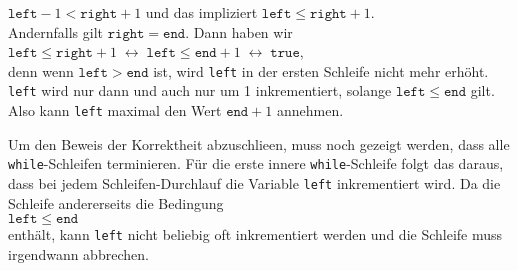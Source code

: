 \begin{enumerate}
      \hspace*{1.3cm} $\mathtt{left} - 1 < \mathtt{right} + 1$ \quad und das impliziert \quad $\mathtt{left} \leq \mathtt{right} + 1$. 
      \\[0.2cm]
      Andernfalls gilt $\texttt{right}=\mathtt{end}$.  Dann haben wir 
      \\[0.2cm]
      \hspace*{1.3cm}
      $\mathtt{left} \leq \mathtt{right} + 1 \;\leftrightarrow\;
       \mathtt{left} \leq \mathtt{end} + 1 \;\leftrightarrow\; \mathtt{true}$,
      \\[0.2cm]
      denn wenn $\texttt{left} > \mathtt{end}$ ist, wird \texttt{left} in der ersten
      Schleife nicht mehr erh\"oht.  \texttt{left} wird nur dann und auch nur um 1
      inkrementiert, solange $\texttt{left} \leq \mathtt{end}$ gilt.
      Also kann \texttt{left} maximal den Wert $\texttt{end} + 1$ annehmen.
\end{enumerate}
Um den Beweis der Korrektheit abzuschlie\3en, muss noch gezeigt werden, dass 
alle \texttt{while}-Schleifen terminieren.  F\"ur die erste innere
\texttt{while}-Schleife folgt das daraus, dass bei jedem Schleifen-Durchlauf die Variable
\texttt{left} inkrementiert wird.  Da die Schleife andererseits die Bedingung \\[0.2cm]
\hspace*{1.3cm} $\texttt{left} \leq \mathtt{end}$ \\[0.2cm]
enth\"alt, kann \texttt{left} nicht beliebig oft inkrementiert werden und die Schleife muss
irgendwann abbrechen. 

